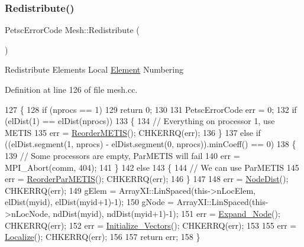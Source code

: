 \subsubsection{\texorpdfstring{Redistribute()}{Redistribute()}}
{\footnotesize\ttfamily Petsc\+Error\+Code Mesh\+::\+Redistribute (\begin{DoxyParamCaption}{ }\end{DoxyParamCaption})}

Redistribute Elements Local \mbox{\hyperlink{class_element}{Element}} Numbering 

Definition at line 126 of file mesh.\+cc.


\begin{DoxyCode}
127 \{
128   \textcolor{keywordflow}{if} (nprocs == 1)
129     \textcolor{keywordflow}{return} 0;
130 
131   PetscErrorCode err = 0;
132   \textcolor{keywordflow}{if} (elDist(1) == elDist(nprocs))
133   \{
134     \textcolor{comment}{// Everything on processor 1, use METIS}
135     err = \mbox{\hyperlink{class_mesh_a0ab1f20471ff5deed8803597b979779d}{ReorderMETIS}}(); CHKERRQ(err);
136   \}
137   \textcolor{keywordflow}{else} \textcolor{keywordflow}{if} ((elDist.segment(1, nprocs) - elDist.segment(0, nprocs)).minCoeff() == 0)
138   \{
139     \textcolor{comment}{// Some processors are empty, ParMETIS will fail}
140     err = MPI\_Abort(comm, 404);
141   \}
142   \textcolor{keywordflow}{else}
143   \{
144     \textcolor{comment}{// We can use ParMETIS}
145     err = \mbox{\hyperlink{class_mesh_ab9c61b0cf7cbcb8738d0e904fe532e91}{ReorderParMETIS}}(); CHKERRQ(err);
146   \}
147 
148   err = \mbox{\hyperlink{class_mesh_aa6b19f4fdf210f8937694e8c7d30ea15}{NodeDist}}(); CHKERRQ(err);
149   gElem = ArrayXI::LinSpaced(this->nLocElem, elDist(myid), elDist(myid+1)-1);
150   gNode = ArrayXI::LinSpaced(this->nLocNode, ndDist(myid), ndDist(myid+1)-1);
151   err = \mbox{\hyperlink{class_mesh_a1930d80c707de6d202dac7cef0022257}{Expand\_Node}}(); CHKERRQ(err);
152   err = \mbox{\hyperlink{class_mesh_af9e180bd8adb9c495e6c38840ea19f10}{Initialize\_Vectors}}(); CHKERRQ(err);
153 
155   err = \mbox{\hyperlink{class_mesh_a54a12376bf99f4f4991af01fc23c9c09}{Localize}}(); CHKERRQ(err);
156 
157   \textcolor{keywordflow}{return} err;
158 \}
\end{DoxyCode}
\mbox{\label{class_mesh_a0ab1f20471ff5deed8803597b979779d}} 
